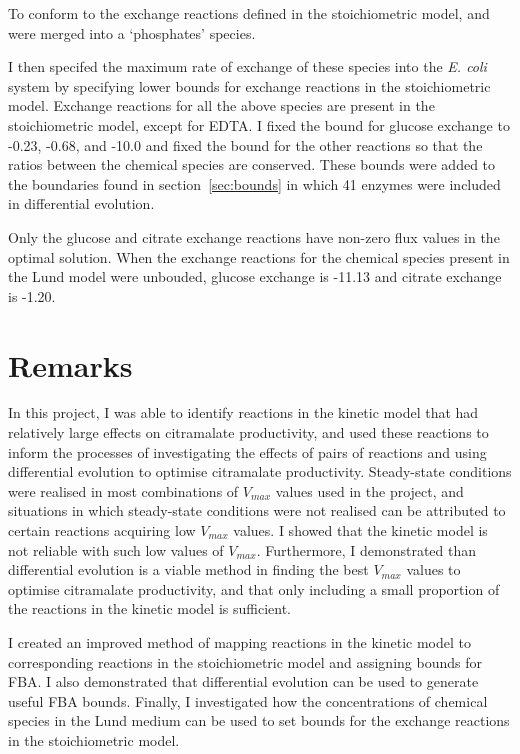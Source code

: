 \documentclass[parskip=full]{scrreprt}
\begin{document}
To conform to the exchange reactions defined in the stoichiometric model,  and  were merged into a `phosphates' species.

I then specifed the maximum rate of exchange of these species into the \emph{E. coli} system by specifying lower bounds for exchange reactions in the stoichiometric model. Exchange reactions for all the above species are present in the stoichiometric model, except for EDTA. I fixed the bound for glucose exchange to -0.23, -0.68, and -10.0 and fixed the bound for the other reactions so that the ratios between the chemical species are conserved. These bounds were added to the boundaries found in section~\ref{sec:bounds} in which 41 enzymes were included in differential evolution.

Only the glucose and citrate exchange reactions have non-zero flux values in the optimal solution. When the exchange reactions for the chemical species present in the Lund model were unbouded, glucose exchange is -11.13 and citrate exchange is -1.20.

\chapter{Remarks}
\label{ch:remarks}

In this project, I was able to identify reactions in the kinetic model that had relatively large effects on citramalate productivity, and used these reactions to inform the processes of investigating the effects of pairs of reactions and using differential evolution to optimise citramalate productivity. Steady-state conditions were realised in most combinations of $V_{max}$ values used in the project, and situations in which steady-state conditions were not realised can be attributed to certain reactions acquiring low $V_{max}$ values. I showed that the kinetic model is not reliable with such low values of $V_{max}$. Furthermore, I demonstrated than differential evolution is a viable method in finding the best $V_{max}$ values to optimise citramalate productivity, and that only including a small proportion of the reactions in the kinetic model is sufficient.

I created an improved method of mapping reactions in the kinetic model to corresponding reactions in the stoichiometric model and assigning bounds for FBA. I also demonstrated that differential evolution can be used to generate useful FBA bounds. Finally, I investigated how the concentrations of chemical species in the Lund medium can be used to set bounds for the exchange reactions in the stoichiometric model.
\end{document}
